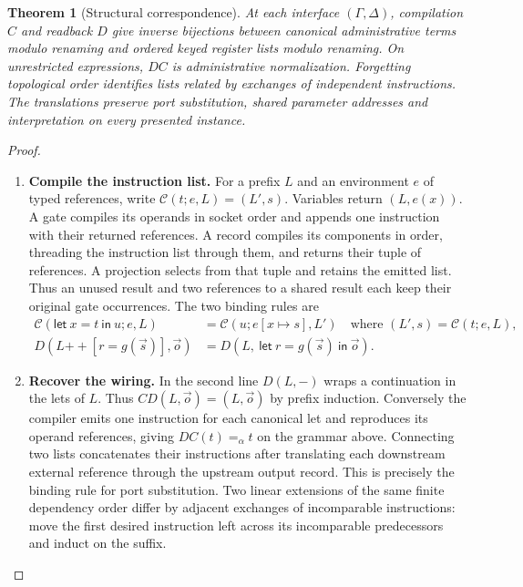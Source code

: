 \documentclass[11pt,a4paper]{article}
\newtheorem{theorem}{Theorem}[section]
\theoremstyle{definition}
\theoremstyle{remark}\newaliascnt{remark}{theorem}
\numberwithin{equation}{section}
\begin{document}
\begin{theorem}[Structural correspondence]\label{thm:compiler-struct}
At each interface \((\Gamma,\Delta)\), compilation \(C\) and readback \(D\) give inverse bijections between canonical administrative terms modulo renaming and ordered keyed register lists modulo renaming. On unrestricted expressions, \(DC\) is administrative normalization. Forgetting topological order identifies lists related by exchanges of independent instructions. The translations preserve port substitution, shared parameter addresses and interpretation on every presented instance.
\end{theorem}
\begin{proof}\leavevmode
\begin{enumerate}[titledsteps]
    \item \textbf{Compile the instruction list.} For a prefix \(L\) and an environment \(e\) of typed references, write \(\mathcal C(t;e,L)=(L',s)\). Variables return \((L,e(x))\). A gate compiles its operands in socket order and appends one instruction with their returned references. A record compiles its components in order, threading the instruction list through them, and returns their tuple of references. A projection selects from that tuple and retains the emitted list. Thus an unused result and two references to a shared result each keep their original gate occurrences. The two binding rules are
\[
\begin{aligned}
 \mathcal C(\mathsf{let}\ x=t\ \mathsf{in}\ u;e,L)
   &=\mathcal C(u;e[x\mapsto s],L')\quad
        \text{where }(L',s)=\mathcal C(t;e,L),\\
 D(L\mathbin{+\!\!+}[r=g(\vec s)],\vec o)
   &=D(L,\ \mathsf{let}\ r=g(\vec s)\ \mathsf{in}\ \vec o).
\end{aligned}
\]

    \item \textbf{Recover the wiring.} In the second line \(D(L,-)\) wraps a continuation in the lets of \(L\). Thus \(CD(L,\vec o)=(L,\vec o)\) by prefix induction. Conversely the compiler emits one instruction for each canonical let and reproduces its operand references, giving \(DC(t)=_\alpha t\) on the grammar above. Connecting two lists concatenates their instructions after translating each downstream external reference through the upstream output record. This is precisely the binding rule for port substitution. Two linear extensions of the same finite dependency order differ by adjacent exchanges of incomparable instructions: move the first desired instruction left across its incomparable predecessors and induct on the suffix.



\end{enumerate}
\end{proof}
\end{document}
